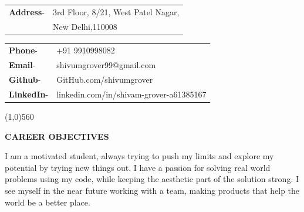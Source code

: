\documentclass[10pt]{article}
\begin{document}
\begin{minipage}{0.5\textwidth}

\vspace{5mm}
\hspace{3mm}
\begin{tabular}{l l}\raggedleft
\color{black!70}\textbf{Address}-& \color{black!70}3rd Floor, 8/21, West Patel Nagar, \\  
    
    & \color{black!70}New Delhi,110008\\

\end{tabular}
\end{minipage}
\begin{minipage}{0.4\textwidth}

\vspace{5mm}
\begin{flushright}
\begin{tabular}{l l}\raggedleft

\color{black!70}\textbf{Phone}-& \color{black!70}+91 9910998082\\ 
\color{black!70}\textbf{Email}-& \color{black!70}shivumgrover99@gmail.com\\
\color{black!70}\textbf{Github}-& \color{black!70}GitHub.com/shivumgrover\\
\color{black!70}\textbf{LinkedIn}-& \color{black!70}linkedin.com/in/shivam-grover-a61385167\\
\end{tabular}
\end{flushright}
\end{minipage}



\begin{center}
\line(1,0){560}
\end{center}

\begin{minipage}{\textwidth}
\vspace{5mm}
\begin{huge}
\textbf{\color{theme}CAREER OBJECTIVES}
\end{huge}
\begin{mdframed}[backgroundcolor=theme]
\end{mdframed}

\vspace{1mm}

\color{black}\normalsize{{I am a motivated student, always trying to push my limits and explore my potential by trying new things out. I have a passion for solving real world problems using my code, while keeping the aesthetic part of the solution strong. I see myself in the near future working with a team, making products that help the world be a better place.
}}
\end{minipage}
\end{document}

